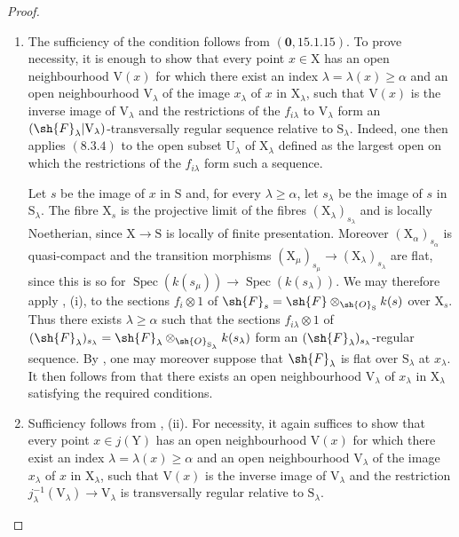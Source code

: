 \begin{proof}
\begin{enumerate}
\item[\rm(i)]
The sufficiency of the condition follows from $(\mathbf{0},15.1.15)$. To prove necessity, it is enough to show that every point $x\in\mathrm{X}$ has an open neighbourhood $\mathrm{V}(x)$ for which there exist an index $\lambda=\lambda(x)\geqslant\alpha$ and an open neighbourhood $\mathrm{V}_\lambda$ of the image $x_\lambda$ of $x$ in $\mathrm{X}_\lambda$, such that $\mathrm{V}(x)$ is the inverse image of $\mathrm{V}_\lambda$ and the restrictions of the $f_{i\lambda}$ to $\mathrm{V}_\lambda$ form an $(\sh{F}_\lambda|\mathrm{V}_\lambda)$-transversally regular sequence relative to $\mathrm{S}_\lambda$. Indeed, one then applies $(8.3.4)$ to the open subset $\mathrm{U}_\lambda$ of $\mathrm{X}_\lambda$ defined as the largest open on which the restrictions of the $f_{i\lambda}$ form such a sequence.

Let $s$ be the image of $x$ in $\mathrm{S}$ and, for every $\lambda\geqslant\alpha$, let $s_\lambda$ be the image of $s$ in $\mathrm{S}_\lambda$. The fibre $\mathrm{X}_s$ is the projective limit of the fibres $(\mathrm{X}_\lambda)_{s_\lambda}$ and is locally Noetherian, since $\mathrm{X}\to\mathrm{S}$ is locally of finite presentation. Moreover $(\mathrm{X}_\alpha)_{s_\alpha}$ is quasi-compact and the transition morphisms $(\mathrm{X}_\mu)_{s_\mu}\to(\mathrm{X}_\lambda)_{s_\lambda}$ are flat, since this is so for $\operatorname{Spec}(k(s_\mu))\to\operatorname{Spec}(k(s_\lambda))$. We may therefore apply , (i), to the sections $f_i\otimes1$ of $\sh{F}_s=\sh{F}\otimes_{\sh{O}_\mathrm{S}}k(s)$ over $\mathrm{X}_s$. Thus there exists $\lambda\geqslant\alpha$ such that the sections $f_{i\lambda}\otimes1$ of $(\sh{F}_\lambda)_{s_\lambda}=\sh{F}_\lambda\otimes_{\sh{O}_{\mathrm{S}_\lambda}}k(s_\lambda)$ form an $(\sh{F}_\lambda)_{s_\lambda}$-regular sequence. By , one may moreover suppose that $\sh{F}_\lambda$ is flat over $\mathrm{S}_\lambda$ at $x_\lambda$. It then follows from  that there exists an open neighbourhood $\mathrm{V}_\lambda$ of $x_\lambda$ in $\mathrm{X}_\lambda$ satisfying the required conditions.

\item[\rm(ii)] Sufficiency follows from , (ii). For necessity, it again suffices to show that every point $x\in j(\mathrm{Y})$ has an open neighbourhood $\mathrm{V}(x)$ for which there exist an index $\lambda=\lambda(x)\geqslant\alpha$ and an open neighbourhood $\mathrm{V}_\lambda$ of the image $x_\lambda$ of $x$ in $\mathrm{X}_\lambda$, such that $\mathrm{V}(x)$ is the inverse image of $\mathrm{V}_\lambda$ and the restriction $j_\lambda^{-1}(\mathrm{V}_\lambda)\to\mathrm{V}_\lambda$ is transversally regular relative to $\mathrm{S}_\lambda$.


\end{enumerate}
\end{proof}
